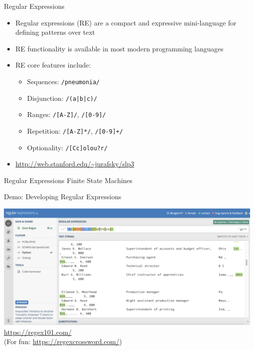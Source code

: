 \documentclass[10pt]{beamer}
\begin{document}
\begin{frame}{Regular Expressions}
\begin{itemize}
  \item \alert{Regular expressions} (RE) are a compact and expressive mini-language for defining \alert{patterns} over text
  \item RE functionality is available in most modern programming languages
  \item RE core features include:
  \begin{itemize}
    \item Sequences: \texttt{/pneumonia/}
    \item Disjunction: \texttt{/(a|b|c)/}
    \item Ranges: \texttt{/[A-Z]/}, \texttt{/[0-9]/}
    \item Repetition: \texttt{/[A-Z]*/}, \texttt{/[0-9]+/}
    \item Optionality: \texttt{/[Cc]olou?r/}
  \end{itemize}
  \item \textcolor{blue}{\url{http://web.stanford.edu/~jurafsky/slp3}}
\end{itemize}
\end{frame}

\begin{frame}{Regular Expressions}
Finite State Machines
\end{frame}

\begin{frame}[fragile]{Demo: Developing Regular Expressions}

\begin{center}
  \includegraphics[scale=0.25]{figures/regex101-screenshot.png}
  \\ \vspace{1em}
  \textcolor{blue}{\url{https://regex101.com/}}
  \\
  (For fun: \textcolor{blue}{\url{https://regexcrossword.com/}})
\end{center}

\end{frame}
\end{document}
